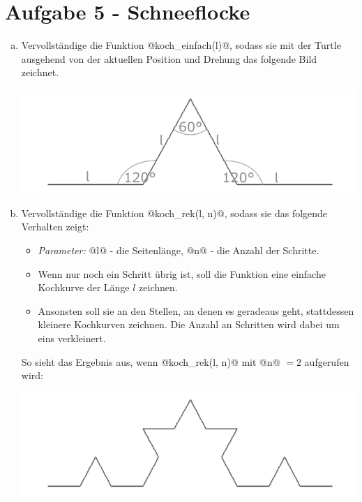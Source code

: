     \section*{Aufgabe 5 - Schneeflocke}
    \begin{enumerate}[(a)]   
        \item 
        Vervollständige die Funktion @koch_einfach(l)@, sodass sie mit der Turtle ausgehend von der aktuellen 
        Position und Drehung das folgende Bild zeichnet.

        \begin{center}
            \includegraphics[scale = 0.5]{img/koch_1}                      
        \end{center}
        
        \item
        Vervollständige die Funktion @koch_rek(l, n)@, sodass sie das folgende Verhalten zeigt:
        \begin{itemize}
            \item 
            \textit{Parameter:} @l@ - die Seitenlänge, @n@ - die Anzahl der Schritte.
            \item
            Wenn nur noch ein Schritt übrig ist, soll die Funktion eine einfache Kochkurve der Länge $l$ zeichnen.
            \item
            Ansonsten soll sie an den Stellen, an denen es geradeaus geht, stattdessen kleinere Kochkurven zeichnen. 
            Die Anzahl an Schritten wird dabei um eins verkleinert.				
        \end{itemize}

        So sieht das Ergebnis aus, wenn @koch_rek(l, n)@ mit @n@ $=2$ aufgerufen wird:
        \begin{center}
            \includegraphics[scale = 0.5]{img/koch_2}                      
        \end{center}


\end{enumerate}
